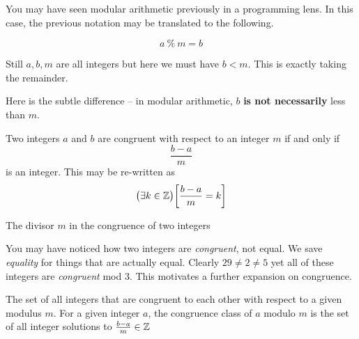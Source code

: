 \documentclass[main.tex]{subfiles}
\begin{document}
You may have seen modular arithmetic previously in a programming lens. In this case, the previous notation may be translated to the following.

\[a \ \% \ m = b\]

Still \(a,b,m\) are all integers but here we must have \(b < m\). This is exactly taking the remainder.

Here is the subtle difference -- in modular arithmetic, \(b\) \textbf{is not necessarily} less than \(m\).

\begin{defn}
	Two integers \(a\) and \(b\) are congruent with respect to an integer \(m\) if and only if \[\frac{b - a}{m}\] is an integer. This may be re-written as \[\big(\exists k \in \mathbb{Z}\big)\bigg[\frac{b-a}{m} = k\bigg]\]
\end{defn}

\begin{defn}
	The divisor \(m\) in the congruence of two integers
\end{defn}


You may have noticed how two integers are \textit{congruent}, not equal. We save \textit{equality} for things that are actually equal. Clearly \(29 \neq 2 \neq 5\) yet all of these integers are \textit{congruent} mod 3. This motivates a further expansion on congruence.

\begin{defn}
	The set of all integers that are congruent to each other with respect to a given modulus \(m\). For a given integer \(a\), the congruence class of \(a\) modulo \(m\) is the set of all integer solutions to \(\frac{b-a}{m} \in \mathbb{Z}\)
\end{defn}
\end{document}
